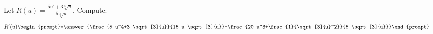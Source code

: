 \documentclass{ximera}
\author{Bart Snapp}
\begin{document}
\begin{exercise}
Let $R(u) = \frac{ 5 u^4+3 \sqrt[3]{u}}{-5 \sqrt[3]{u}}$. Compute:
\[
R'(u)
\begin{prompt}=\answer{\frac{5 u^4+3 \sqrt[3]{u}}{15 u \sqrt[3]{u}}-\frac{20 u^3+\frac{1}{\sqrt[3]{u}^2}}{5 \sqrt[3]{u}}}\end{prompt}
\]
\end{exercise}
\end{document}
